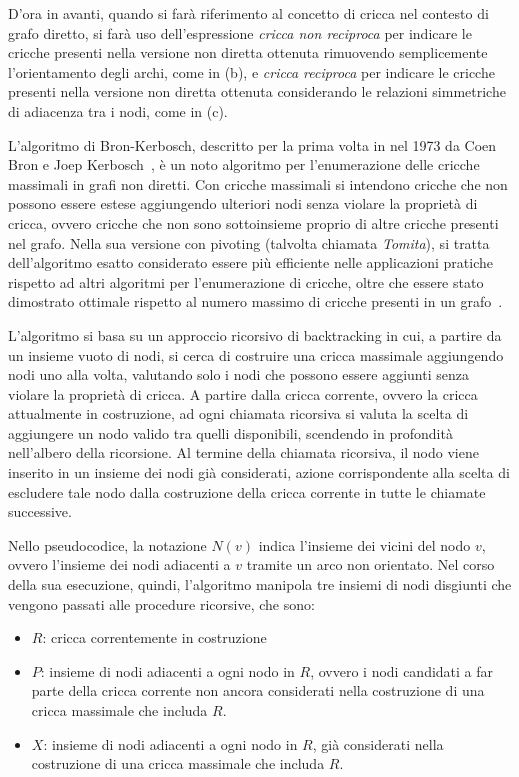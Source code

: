 D'ora in avanti, quando si far\`a riferimento al concetto di cricca nel contesto di grafo diretto, si far\`a
uso dell'espressione \textit{cricca non reciproca} per indicare le cricche presenti nella versione non diretta
ottenuta rimuovendo semplicemente l'orientamento degli archi, come in (b), e \textit{cricca reciproca} per indicare
le cricche presenti nella versione non diretta ottenuta considerando le relazioni simmetriche di adiacenza tra i nodi,
come in (c).



L'algoritmo di Bron-Kerbosch, descritto per la prima volta in nel 1973 da Coen Bron e Joep Kerbosch~\cite{10.1145/362342.362367},
\`e un noto algoritmo per l'enumerazione delle cricche massimali in grafi non diretti.
Con cricche massimali si intendono cricche che non possono essere estese aggiungendo ulteriori nodi senza
violare la propriet\`a di cricca, ovvero cricche che non sono sottoinsieme proprio di altre cricche presenti nel grafo.
Nella sua versione con pivoting (talvolta chiamata \textit{Tomita}), si tratta dell'algoritmo esatto considerato essere
pi\`u efficiente nelle applicazioni pratiche rispetto ad altri algoritmi per l'enumerazione di cricche, oltre che
essere stato dimostrato ottimale rispetto al numero massimo di cricche presenti in un grafo~\cite{TOMITA200628}.
\newline

L'algoritmo si basa su un approccio ricorsivo di backtracking in cui, a partire da un insieme vuoto di nodi, si
cerca di costruire una cricca massimale aggiungendo nodi uno alla volta, valutando solo i nodi che
possono essere aggiunti senza violare la propriet\`a di cricca.
A partire dalla cricca corrente, ovvero la cricca attualmente in costruzione, ad ogni chiamata ricorsiva si valuta
la scelta di aggiungere un nodo valido tra quelli disponibili, scendendo in profondit\`a nell'albero della ricorsione.
Al termine della chiamata ricorsiva, il nodo viene inserito in un insieme dei nodi
gi\`a considerati, azione corrispondente alla scelta di escludere tale nodo dalla costruzione della cricca corrente in tutte
le chiamate successive. \newline



Nello pseudocodice, la notazione $N(v)$ indica l'insieme dei vicini del nodo $v$, ovvero l'insieme dei nodi adiacenti
a $v$ tramite un arco non orientato.
Nel corso della sua esecuzione, quindi, l'algoritmo manipola tre insiemi di nodi disgiunti che vengono passati
alle procedure ricorsive, che sono:
\begin{itemize}
    \item $R$: cricca correntemente in costruzione
    \item $P$: insieme di nodi adiacenti a ogni nodo in $R$, ovvero i nodi candidati a far parte della cricca corrente
    non ancora considerati nella costruzione di una cricca massimale che includa $R$.
    \item $X$: insieme di nodi adiacenti a ogni nodo in $R$, gi\`a considerati nella costruzione di una cricca
    massimale che includa $R$.
\end{itemize}


